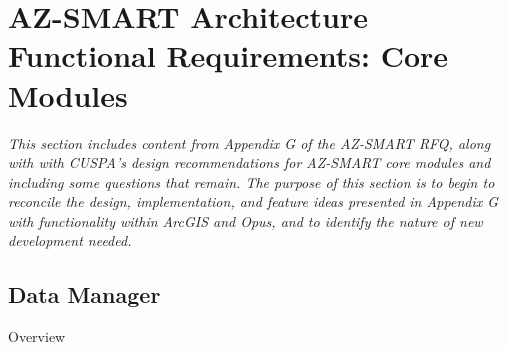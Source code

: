 \section{AZ-SMART Architecture Functional Requirements: Core Modules}
\emph{This section includes content from Appendix G of the AZ-SMART RFQ, along with with CUSPA's design recommendations for AZ-SMART core modules and including some questions that remain.  The purpose of this section is to begin to reconcile the design, implementation, and feature ideas presented in Appendix G with functionality within ArcGIS and Opus, and to identify the nature of new development needed.}

\subsection{Data Manager}
Overview
